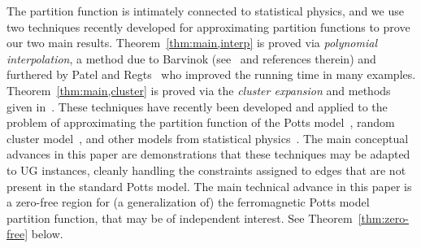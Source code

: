 \documentclass[10pt,a4paper]{article}
\theoremstyle{definition}
\begin{document}
The partition function is intimately connected to statistical physics, and we use two techniques recently developed for approximating partition functions to prove our two main results. 
Theorem~\ref{thm:main,interp} is proved via \emph{polynomial interpolation}, a method due to Barvinok (see~\cite{Barvinok16} and references therein) and furthered by Patel and Regts~\cite{PR17} who improved the running time in many examples.
 Theorem~\ref{thm:main,cluster} is proved via the \emph{cluster expansion} and methods given in~\cite{BCHPT19}. 
These techniques have recently been developed and applied to the problem of approximating the partition function of the Potts model~\cite{Barvinok16,BDPR18,BCHPT19,LSS19}, random cluster model~\cite{BCHPT19}, and other models from statistical physics~\cite{Barvinok16,HPR19,PR17}.
The main conceptual advances in this paper are demonstrations that these techniques may be adapted to UG instances, cleanly handling the constraints assigned to edges that are not present in the standard Potts model. 
The main technical advance in this paper is a zero-free region for (a generalization of) the ferromagnetic Potts model partition function, that may be of independent interest. See Theorem~\ref{thm:zero-free} below.
%
%

\setcounter{theorem}{5}
\end{document}
